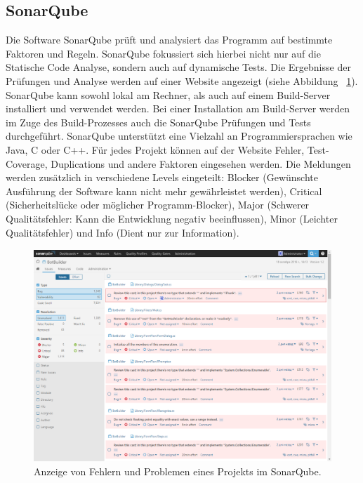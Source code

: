 \subsection{SonarQube}
Die Software SonarQube prüft und analysiert das Programm auf bestimmte Faktoren und Regeln. SonarQube fokussiert sich hierbei nicht nur auf die Statische Code Analyse, sondern auch auf dynamische Tests. Die Ergebnisse der Prüfungen und Analyse werden auf einer Website angezeigt (siehe Abbildung ~\ref{fig:sonarQube}). SonarQube kann sowohl lokal am Rechner, als auch auf einem Build-Server installiert und verwendet werden. Bei einer Installation am Build-Server werden im Zuge des Build-Prozesses auch die SonarQube Prüfungen und Tests durchgeführt. SonarQube unterstützt eine Vielzahl an Programmiersprachen wie Java, C oder C++. Für jedes Projekt können auf der Website Fehler, Test-Coverage, Duplications und andere Faktoren eingesehen werden. Die Meldungen werden zusätzlich in verschiedene Levels eingeteilt: Blocker (Gewünschte Ausführung der Software kann nicht mehr gewährleistet werden), Critical (Sicherheitslücke oder möglicher Programm-Blocker), Major (Schwerer Qualitätsfehler: Kann die Entwicklung negativ beeinflussen), Minor (Leichter Qualitätsfehler) und Info (Dient nur zur Information). \parencite{sonarQubeHeise}

\begin{figure}[tp]
  \centering
  \includegraphics[height=8cm]{images/sonarQube.PNG}
 \caption[Anzeige von Fehlern und Problemen eines Projekts im SonarQube]{Anzeige von Fehlern und Problemen eines Projekts im SonarQube.}
  \label{fig:sonarQube}
\end{figure}


